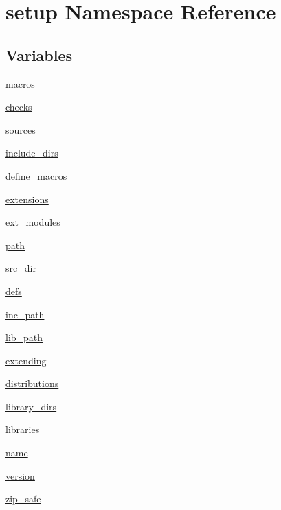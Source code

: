 \hypertarget{namespacesetup}{}\section{setup Namespace Reference}
\label{namespacesetup}
\subsection*{Variables}
\begin{DoxyCompactItemize}
\item 
\hyperlink{namespacesetup_a072a530a8594383fbed1f06ea49b1787}{macros}
\item 
\hyperlink{namespacesetup_acc4a649fba9fedfaf1f9c200e197e96b}{checks}
\item 
\hyperlink{namespacesetup_af861551454f76f32dddf20c744c81bd6}{sources}
\item 
\hyperlink{namespacesetup_a52eaf4a217a97fb82180c1b16165017e}{include\+\_\+dirs}
\item 
\hyperlink{namespacesetup_af8c11b3218cdfa084ea78be7e73974bf}{define\+\_\+macros}
\item 
\hyperlink{namespacesetup_a7d6a659c7fd056d592f248c1a98e6f86}{extensions}
\item 
\hyperlink{namespacesetup_a1bf56ea61d1e9865f316116dca2fbfea}{ext\+\_\+modules}
\item 
\hyperlink{namespacesetup_a7951a015fdeba223e18f4bc68c9a6e5e}{path}
\item 
\hyperlink{namespacesetup_abb4577a57e80caeb45d3c457c50b53bb}{src\+\_\+dir}
\item 
\hyperlink{namespacesetup_af90b2ad2378213038ae38ac1150a2376}{defs}
\item 
\hyperlink{namespacesetup_ade94c7b653e62bdd1fdba12047cca775}{inc\+\_\+path}
\item 
\hyperlink{namespacesetup_acfbd6d7d8b3cb47695abfeca42d428bf}{lib\+\_\+path}
\item 
\hyperlink{namespacesetup_afca45858e24c87f02058342bacc38797}{extending}
\item 
\hyperlink{namespacesetup_a6c5e2e54ed09e9c891f2e1d3fb227eda}{distributions}
\item 
\hyperlink{namespacesetup_a1f8901799e0c49c469161a6a4e79e759}{library\+\_\+dirs}
\item 
\hyperlink{namespacesetup_a17e2cff089b5f4cf673c996e4ef08adb}{libraries}
\item 
\hyperlink{namespacesetup_ab3a7a0638d76a01367c5bc3cc699447f}{name}
\item 
\hyperlink{namespacesetup_a2aa722b36a933088812b50ea79b97a5c}{version}
\item 
\hyperlink{namespacesetup_a13510753661cb74083a0c664db11dde9}{zip\+\_\+safe}
\end{DoxyCompactItemize}


